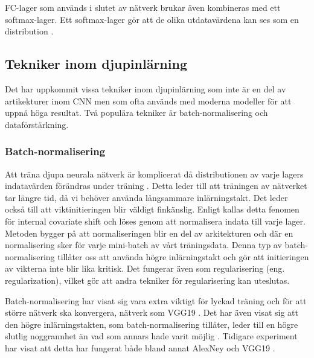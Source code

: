 \documentclass[]{kththesis}
\begin{document}
FC-lager som används i slutet av nätverk brukar även kombineras med ett softmax-lager. Ett softmax-lager gör att de olika utdatavärdena kan ses som en distribution \parencite{Goodfellow-et-al-2016}.

\subsection{Tekniker inom djupinlärning}
Det har uppkommit vissa tekniker inom djupinlärning som inte är en del av artikekturer inom CNN men som ofta används med moderna modeller för att uppnå höga resultat. Två populära tekniker är batch-normalisering och dataförstärkning.

\subsubsection{Batch-normalisering}
Att träna djupa neurala nätverk är komplicerat då distributionen av varje lagers indatavärden förändras under träning \parencite{ioffe2015batch}. Detta leder till att träningen av nätverket tar längre tid, då vi behöver använda långsammare inlärningstakt. Det leder också till att viktinitieringen blir väldigt finkänslig. Enligt \textcite{ioffe2015batch} kallas detta fenomen för internal covariate shift och löses genom att normalisera indata till varje lager. Metoden bygger på att normaliseringen blir en del av arkitekturen och där en normalisering sker för varje mini-batch av vårt träningsdata. Denna typ av batch-normalisering tillåter oss att använda högre inlärningstakt och gör att initieringen av vikterna inte blir lika kritisk. Det fungerar även som regularisering (eng. regularization), vilket gör att andra tekniker för regularisering kan uteslutas.

Batch-normalisering har visat sig vara extra viktigt för lyckad träning och för att större nätverk ska konvergera, nätverk som VGG19 \parencite{simon2016imagenet}. Det har även visat sig att den högre inlärningstakten, som batch-normalisering tillåter, leder till en högre slutlig noggrannhet än vad som annars hade varit möjlig \parencite{simon2016imagenet}. Tidigare experiment har visat att detta har fungerat både bland annat AlexNey och VGG19 \parencite{simon2016imagenet}.
\end{document}
